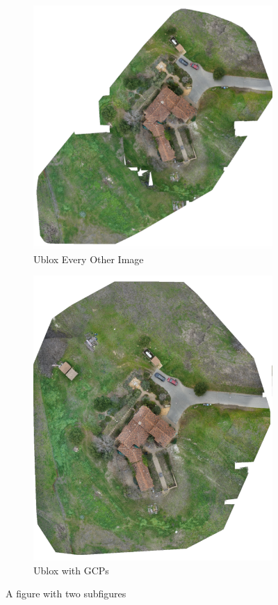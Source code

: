 \documentclass{article}
\begin{document}
\begin{figure}
\begin{subfigure}{.33\textwidth}
  \includegraphics[width=.75\linewidth]{images/orthomosaics/ublox_every_other_image.png}
  \caption{Ublox Every Other Image}
  \label{fig:sub1}
\end{subfigure}%
\begin{subfigure}{.33\textwidth}
  \centering
  \includegraphics[width=.75\linewidth]{images/orthomosaics/ublox_gcp.png}
  \caption{Ublox with GCPs}
  \label{fig:sub1}
\end{subfigure}%
\caption{A figure with two subfigures}
\label{fig:test}
\end{figure}
\end{document}
